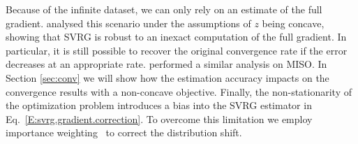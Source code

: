 \documentclass{article}
\makeatletter
\theoremstyle{remark}
\theoremstyle{definition}
\DeclareRobustCommand{\eg}{e.g.,\@\xspace}
\makeatother
\begin{document}
Because of the infinite dataset, we can only rely on an estimate of the full gradient.
\citet{harikandeh2015stopwasting} analysed this scenario under the assumptions of $z$ being concave, showing that SVRG is robust to an inexact computation of the full gradient. In particular, it is still possible to recover the original convergence rate if the error decreases at an appropriate rate. \citet{bietti2017stochastic} performed a similar analysis on MISO. In Section \ref{sec:conv} we will show how the estimation accuracy impacts on the convergence results with a non-concave objective.
Finally, the non-stationarity of the optimization problem introduces a bias into the SVRG estimator in Eq.~\eqref{E:svrg.gradient.correction}.
To overcome this limitation we employ importance weighting~\citep[\eg][]{rubinstein1981simulation,precup2000eligibility} to correct the distribution shift.
\end{document}
